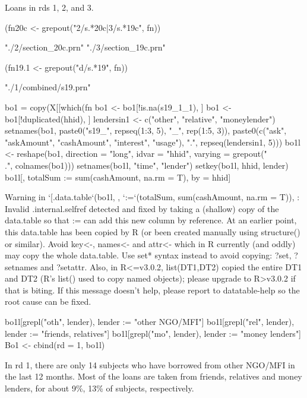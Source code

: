 Loans in rds 1, 2, and 3.
\begin{Schunk}
\begin{Sinput}
(fn20c <- grepout("2/s.*20c|3/s.*19c", fn))
\end{Sinput}
\begin{Soutput}
[1] "./2/section_20c.prn" "./3/section_19c.prn"
\end{Soutput}
\begin{Sinput}
(fn19.1 <- grepout("d/s.*19", fn))
\end{Sinput}
\begin{Soutput}
[1] "./1/combined/s19.prn"
\end{Soutput}
\begin{Sinput}
bo1 = copy(X[[which(fn %in% fn19.1)]])
bo1 <- bo1[!is.na(s19_1_1), ]
bo1 <- bo1[!duplicated(hhid), ]
lendersin1 <- c("other", "relative", "moneylender")
setnames(bo1, paste0("s19_", repseq(1:3, 5), "_", rep(1:5, 3)),
	paste0(c("ask", "askAmount", "cashAmount", "interest", "usage"), ".", 
	repseq(lendersin1, 5)))
bo1l <- reshape(bo1, direction = "long", idvar = "hhid",
	varying = grepout("\\.", colnames(bo1)))
setnames(bo1l, "time", "lender")
setkey(bo1l, hhid, lender)
bo1l[, totalSum := sum(cashAmount, na.rm = T), by = hhid]
\end{Sinput}
\begin{Soutput}
Warning in `[.data.table`(bo1l, , `:=`(totalSum, sum(cashAmount, na.rm = T)), : Invalid .internal.selfref detected and fixed by taking a (shallow) copy of the data.table so that := can add this new column by reference. At an earlier point, this data.table has been copied by R (or been created manually using structure() or similar). Avoid key<-, names<- and attr<- which in R currently (and oddly) may copy the whole data.table. Use set* syntax instead to avoid copying: ?set, ?setnames and ?setattr. Also, in R<=v3.0.2, list(DT1,DT2) copied the entire DT1 and DT2 (R's list() used to copy named objects); please upgrade to R>v3.0.2 if that is biting. If this message doesn't help, please report to datatable-help so the root cause can be fixed.
\end{Soutput}
\begin{Sinput}
bo1l[grepl("oth", lender), lender := "other NGO/MFI"]
bo1l[grepl("rel", lender), lender := "friends, relatives"]
bo1l[grepl("mo", lender), lender := "money lenders"]
Bo1 <- cbind(rd = 1, bo1l)
\end{Sinput}
\end{Schunk}
In rd 1, there are only 14 subjects who have borrowed from \textsf{other NGO/MFI} in the last 12 months. Most of the loans are taken from \textsf{friends, relatives} and \textsf{money lenders}, for about 9\%, 13\% of subjects, respectively.
